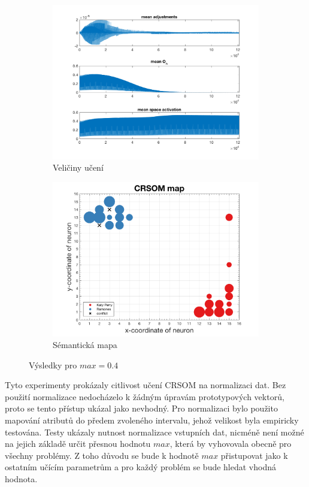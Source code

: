 \documentclass[thesis=M,czech]{FITthesis}[2012/06/26]
\begin{document}
\begin{figure}
\centering
\begin{subfigure}{.5\textwidth}
  \centering
  \includegraphics[width=.99\linewidth]{norm-learnattrs400.png}
  \caption{Veličiny učení}
  \label{fig:sub1}
\end{subfigure}%
\begin{subfigure}{.5\textwidth}
  \centering
  \includegraphics[width=.99\linewidth]{exp_kp_ram_crsom.png}
  \caption{Sémantická mapa}
  \label{fig:resmap400}
\end{subfigure}
\caption{Výsledky pro  $max=0.4$}
\label{fig:top}
\end{figure}


Tyto experimenty prokázaly citlivost učení CRSOM na normalizaci dat. Bez použití normalizace nedocházelo k žádným úpravám prototypových vektorů, proto se tento přístup ukázal jako nevhodný. Pro normalizaci bylo použito mapování atributů do předem zvoleného intervalu, jehož velikost byla empiricky testována. Testy ukázaly nutnost normalizace vstupních dat, nicméně není možné na jejich základě určit přesnou hodnotu $max$, která by vyhovovala obecně pro všechny problémy. Z toho důvodu se bude k hodnotě $max$ přistupovat jako k ostatním učícím parametrům a pro každý problém se bude hledat vhodná hodnota.
\end{document}
